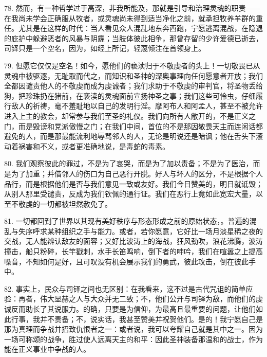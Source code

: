 78. 然而，有一种哲学过于高深，非我所能及，那就是引导和治理灵魂的职责——在我尚未学会正确服从牧者，或灵魂尚未得到适当净化之前，就承担牧养羊群的重任。尤其是在这样的时代：当人看见众人混乱地东奔西跑，宁愿逃离混战，在隐退的庇护中躲避恶者的风暴与阴霾；当肢体彼此相争，那曾存留的少许爱德已逝去，司铎只是一个空名，因为，如经上所记，轻蔑倾注在首领身上。\par

79. 但愿它仅仅是空名！如今，愿他们的亵渎归于不敬虔者的头上！一切敬畏已从灵魂中被驱逐，无耻取而代之，而知识和圣神的深奥事理向任何愿意者开放；我们全都因谴责他人的不敬虔而成为虔诚者；我们求助于不敬虔的审判官，将圣物丢给狗，把珍珠扔在猪前，在亵渎的灵魂面前宣扬神圣之事；我们这些可怜虫，仔细履行敌人的祈祷，毫不羞耻地以自己的发明行淫。摩阿布人和阿孟人，甚至不被允许进入上主的教会，却常参与我们至圣的礼仪。我们向所有人敞开的，不是正义之门，而是毁谤和党派傲慢之门；在我们中间，首位的不是那因敬畏天主而连闲话都避免的人，而是那最能流利地辱骂邻人的人，无论是明说还是暗讽；他在舌头下滚动着祸害和不义，或者更准确地说，是毒蛇的毒素。\par

80. 我们观察彼此的罪过，不是为了哀哭，而是为了加以责备；不是为了医治，而是为了加重；并借邻人的伤口为自己恶行开脱。好人与坏人的区分，不是根据个人品行，而是根据他们是否与我们意见一致或友好。我们今日赞美的，明日就诋毁；从别人那里受谴责，反成为我们钦佩的通行证。我们在恶行上竟如此宽宏大量，以至不敬虔的一切都被坦然赦免了。\par

81. 一切都回到了世界以其现有美好秩序与形态形成之前的原始状态，\newline{}。普遍的混乱与失序呼求某种组织之手与能力。或者，若你愿意，它好比一场月淡星稀之夜的交战，无人能辨认敌友的面容；又好比波涛上的海战，狂风劲吹，浪花沸腾，波涛撞击，船只粉碎，长竿戳刺，水手长笛鸣响，倒下者的呻吟，我们在喧嚣之上提高嗓音，不知如何是好，且可叹没有机会展示我们的勇武，彼此攻击，倒在彼此手中。\par

82. 事实上，民众与司铎之间也无区别：在我看来，这不过是古代咒诅的简单应验：再者，伟大显赫之人与大众并无二致；不，他们公开与司铎为敌，而他们的虔诚反而助长了其说服力。的确，只要是为信仰，为最高且最重要的问题，让他们如此行事，我并不责备；不，说实话，我甚至赞美并祝贺他们。是的！我宁愿自己是那为真理而争战并招致仇恨者之一：或者说，我可以夸耀自己就是其中之一。因为一场可称颂的战争，胜过使人远离天主的和平：因此圣神装备那温和的战士，作为能在正义事业中争战的人。\par

